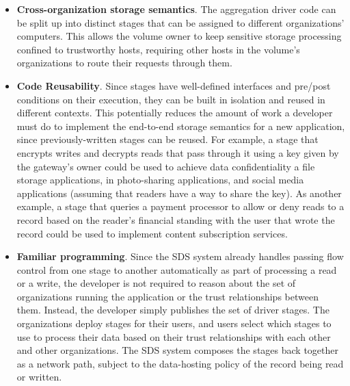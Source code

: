 \begin{itemize}
   \item \textbf{Cross-organization storage semantics}.  The aggregation driver code
      can be split up into distinct stages that can be
      assigned to different organizations' computers.  This allows the volume
      owner to keep sensitive storage processing confined to trustworthy hosts,
      requiring other hosts in the volume's organizations to route their requests
      through them.
   \item \textbf{Code Reusability}.  Since stages have well-defined interfaces
      and pre/post conditions on their execution,
      they can be built in isolation and reused in different contexts.  This
      potentially reduces the amount of work a developer must do to implement
      the end-to-end storage semantics for a new application, since
      previously-written stages can be reused.  For example, a stage that
      encrypts writes and decrypts reads that pass through it using a key given
      by the gateway's owner could be used to achieve data confidentiality a file
      storage applications, in photo-sharing applications, and social media
      applications (assuming that readers have a way to share the key).
      As another example, a stage that queries a payment
      processor to allow or deny reads to a record based on the reader's financial
      standing with the user that wrote the record could be used to implement 
      content subscription services.
   \item \textbf{Familiar programming}.  Since the SDS system already handles passing
      flow control from one stage to another automatically as part of processing
      a read or a write, the developer is not required to reason about the set
      of organizations running the application or the trust relationships
      between them.  Instead, the developer simply publishes the set of driver
      stages.  The organizations deploy stages for their users, and users select
      which stages to use to process their data based on their trust
      relationships with each other and other organizations.
      The SDS system composes the stages back together as a
      network path, subject to the data-hosting policy of the record being read
      or written.
\end{itemize}

